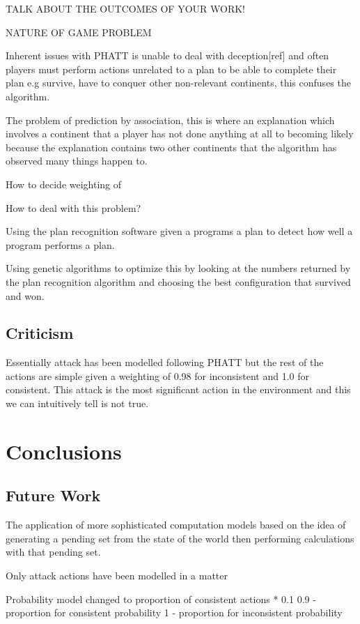 \documentclass[parskip]{cs4rep}
\begin{document}
TALK ABOUT THE OUTCOMES OF YOUR WORK!

NATURE OF GAME PROBLEM

Inherent issues with PHATT is unable to deal with deception[ref] and often players must perform actions unrelated to a plan to be able to complete their plan e.g survive, have to conquer other non-relevant continents, this confuses the algorithm.

The problem of prediction by association, this is where an explanation which involves a continent that a player has not done anything at all to becoming likely because the explanation contains two other continents that the algorithm has observed many things happen to.

How to decide weighting of 

How to deal with this problem?

Using the plan recognition software given a programs a plan to detect how well a program performs a plan. 

Using genetic algorithms to optimize this by looking at the numbers returned by the plan recognition algorithm and choosing the best configuration that survived and won.

\section{Criticism}

Essentially attack has been modelled following PHATT but the rest of the actions are simple given a weighting of 0.98 for inconsistent and 1.0 for consistent. This attack is the most significant action in the environment and this we can intuitively tell is not true.

\chapter{Conclusions}

\section{Future Work}

The application of more sophisticated computation models based on the idea of generating a pending set from the state of the world then performing calculations with that pending set.

Only attack actions have been modelled in a matter 

Probability model changed to proportion of consistent actions * 0.1 
0.9 - proportion for consistent probability
1 - proportion for inconsistent probability
\end{document}
